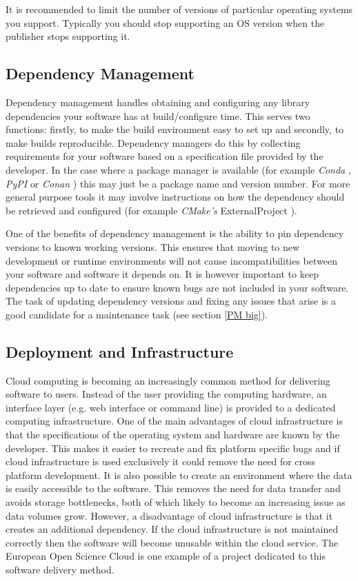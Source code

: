 \documentclass[jnr]{iosart2x}
\begin{document}
It is recommended to limit the number of versions of particular operating systems you support.
Typically you should stop supporting an OS version when the publisher stops supporting it.

\subsection{Dependency Management}
\label{Dependency Management}

Dependency management handles obtaining and configuring any library dependencies your software has at build/configure time.
This serves two functions: firstly, to make the build environment easy to set up and secondly, to make builds reproducible.
Dependency managers do this by collecting requirements for your software based on a specification file provided by the developer.
In the case where a package manager is available (for example {\it Conda} \cite{Conda}, {\it PyPI} \cite{PyPI} or {\it Conan} \cite{Conan}) this may just be a package name and version number.
For more general purpose tools it may involve instructions on how the dependency should be retrieved and configured (for example {\it CMake's} ExternalProject \cite{CMake_ExternalProject}).

One of the benefits of dependency management is the ability to pin dependency versions to known working versions.
This ensures that moving to new development or runtime environments will not cause incompatibilities between your software and software it depends on.
It is however important to keep dependencies up to date to ensure known bugs are not included in your software.
The task of updating dependency versions and fixing any issues that arise is a good candidate for a maintenance task (see section \ref{PM big}).

\subsection{Deployment and Infrastructure}
\label{Infrastructure}

Cloud computing is becoming an increasingly common method for delivering software to users.
Instead of the user providing the computing hardware, an interface layer (e.g. web interface or command line) is provided to a dedicated computing infrastructure.
One of the main advantages of cloud infrastructure is that the specifications of the operating system and hardware are known by the developer.
This makes it easier to recreate and fix platform specific bugs and if cloud infrastructure is used exclusively it could remove the need for cross platform development.
It is also possible to create an environment where the data is easily accessible to the software.
This removes the need for data transfer and avoids storage bottlenecks, both of which likely to become an increasing issue as data volumes grow.
However, a disadvantage of cloud infrastructure is that it creates an additional dependency.
If the cloud infrastructure is not maintained correctly then the software will become unusable within the cloud service.
The European Open Science Cloud \cite{EOSC} is one example of a project dedicated to this software delivery method.
\end{document}
